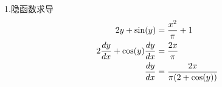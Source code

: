 \documentclass[UTF8,fontset=ubuntu]{ctexart}
\begin{document}
	1.隐函数求导
	\begin{align}
		2y+\sin(y) & =\frac{x^2}{\pi}+1\\
		2\frac{dy}{dx}+\cos(y)\frac{dy}{dx} & =\frac{2x}{\pi}\notag\\
		\frac{dy}{dx} & =\frac{2x}{\pi(2+\cos(y))}\notag
	\end{align}
\end{document}
